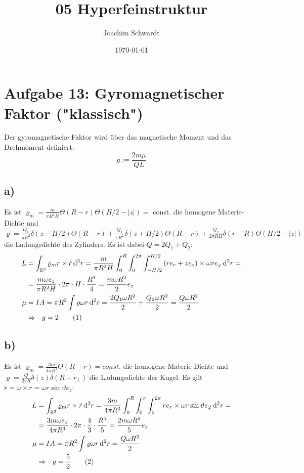 \documentclass[a4paper,12pt]{article}
\newcommand\numberthis{\addtocounter{equation}{1}\tag{\theequation}}
\newcommand{\intr}{}
\begin{document}
\title{05 Hyperfeinstruktur}
\author{Joachim Schwardt}
\date{\today}
\maketitle

\section*{Aufgabe 13: Gyromagnetischer Faktor ("klassisch")}
Der gyromagnetische Faktor wird über das magnetische Moment und das Drehmoment definiert:
$$g:=\frac{2m\mu }{QL}$$
\subsection*{a)} 
Es ist $\varrho_m=\frac{m}{\pi R^2H}\Theta(R-r)\Theta(H/2-|z|)=$ const. die homogene Materie-Dichte und $\varrho=\frac{Q_1}{\pi R^2}\delta(z-H/2)\Theta(R-r)+\frac{Q_1}{\pi R^2}\delta(z+H/2)\Theta(R-r)+\frac{Q_2}{2\pi RH}\delta (r-R)\Theta(H/2-|z|)$ die Ladungsdichte des Zylinders. Es ist dabei $Q=2Q_1+Q_2$:
\begin{align*}
L&=\intr\int_{\mathbb{R}^{3}}{\varrho_mr\times \dot{r}}\,\mathrm{d}^{3}r=\frac{m}{\pi R^2H}\intr\int_{0}^R\int_0^{2\pi}\int_{-H/2}^{H/2}{(re_r+ze_z)\times\omega re_\varphi}\,\mathrm{d}^{3}r=\\
&=\frac{m\omega e_z}{\pi R^2H}\cdot 2\pi\cdot H\cdot \frac{R^4}{4}=\frac{m\omega R^2}{2}e_z \\
\mu&=IA=\pi R^2\int \varrho\omega r\,\mathrm{d}^2r=\frac{2Q_1\omega R^2}{2}+\frac{Q_2\omega R^2}{2}=\frac{Q\omega R^2}{2} \\
&\Rightarrow\ \ g=2\numberthis\label{g Zylinder}
\end{align*}
\subsection*{b)}
Es ist $\varrho_m=\frac{3m}{4\pi R^3}\Theta(R-r)=const$. die homogene Materie-Dichte und $\varrho=\frac{Q}{2\pi R}\delta(z)\delta(R-r_\bot)$ die Ladungsdichte der Kugel. Es gilt $\dot{r}=\omega\times r=\omega r \sin\vartheta e_z$:
\begin{align*}
L&=\intr\int_{\mathbb{R}^{3}}{\varrho_mr\times \dot{r}}\,\mathrm{d}^{3}r=\frac{3m}{4\pi R^3}\int_0^R\int_0^\pi\int_0^{2\pi}{re_r\times\omega r\sin\vartheta e_\varphi}\,\mathrm{d}^{3}r= \\
&=\frac{3m\omega e_z}{4\pi R^3}\cdot 2\pi\cdot \frac{4}{3}\cdot \frac{R^5}{5}=\frac{2m\omega R^2}{5} e_z \\
\mu&=IA=\pi R^2\int \varrho\omega r\,\mathrm{d}^2r=\frac{Q\omega R^2}{2} \\
&\Rightarrow\ \ g=\frac{5}{2}\numberthis\label{g Kugel}
\end{align*}
\end{document}
